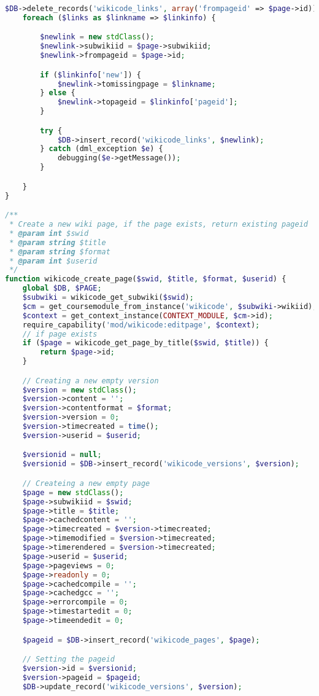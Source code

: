 \begin{lstlisting}[language=PHP]
    $DB->delete_records('wikicode_links', array('frompageid' => $page->id));
    foreach ($links as $linkname => $linkinfo) {

        $newlink = new stdClass();
        $newlink->subwikiid = $page->subwikiid;
        $newlink->frompageid = $page->id;

        if ($linkinfo['new']) {
            $newlink->tomissingpage = $linkname;
        } else {
            $newlink->topageid = $linkinfo['pageid'];
        }

        try {
            $DB->insert_record('wikicode_links', $newlink);
        } catch (dml_exception $e) {
            debugging($e->getMessage());
        }

    }
}

/**
 * Create a new wiki page, if the page exists, return existing pageid
 * @param int $swid
 * @param string $title
 * @param string $format
 * @param int $userid
 */
function wikicode_create_page($swid, $title, $format, $userid) {
    global $DB, $PAGE;
    $subwiki = wikicode_get_subwiki($swid);
    $cm = get_coursemodule_from_instance('wikicode', $subwiki->wikiid);
    $context = get_context_instance(CONTEXT_MODULE, $cm->id);
    require_capability('mod/wikicode:editpage', $context);
    // if page exists
    if ($page = wikicode_get_page_by_title($swid, $title)) {
        return $page->id;
    }

    // Creating a new empty version
    $version = new stdClass();
    $version->content = '';
    $version->contentformat = $format;
    $version->version = 0;
    $version->timecreated = time();
    $version->userid = $userid;

    $versionid = null;
    $versionid = $DB->insert_record('wikicode_versions', $version);

    // Createing a new empty page
    $page = new stdClass();
    $page->subwikiid = $swid;
    $page->title = $title;
    $page->cachedcontent = '';
    $page->timecreated = $version->timecreated;
    $page->timemodified = $version->timecreated;
    $page->timerendered = $version->timecreated;
    $page->userid = $userid;
    $page->pageviews = 0;
    $page->readonly = 0;
	$page->cachedcompile = '';
	$page->cachedgcc = '';
	$page->errorcompile = 0;
	$page->timestartedit = 0;
	$page->timeendedit = 0;

    $pageid = $DB->insert_record('wikicode_pages', $page);

    // Setting the pageid
    $version->id = $versionid;
    $version->pageid = $pageid;
    $DB->update_record('wikicode_versions', $version);


\end{lstlisting}
